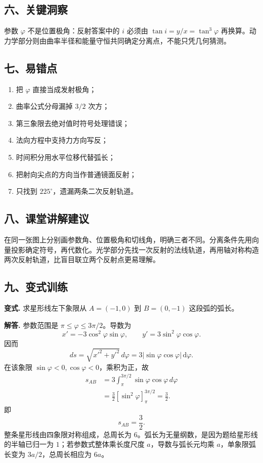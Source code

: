 \documentclass[12pt,a4paper,UTF8]{ctexart}
\newcommand{\tightlist}{\setlength{\itemsep}{0pt}\setlength{\parskip}{0pt}}
\begin{document}
\subsection{六、关键洞察}\label{ux516dux5173ux952eux6d1eux5bdf-6}

参数 \(\varphi\) 不是位置极角：反射答案中的 \(i\) 必须由
\(\tan i=y/x=\tan^3\varphi\)
再换算。动力学部分则由曲率半径和能量守恒共同确定分离点，不能只凭几何猜测。

\subsection{七、易错点}\label{ux4e03ux6613ux9519ux70b9-6}

\begin{enumerate}
\def\labelenumi{\arabic{enumi}.}
\tightlist
\item
  把 \(\varphi\) 直接当成发射极角；
\item
  曲率公式分母漏掉 \(3/2\) 次方；
\item
  第三象限去绝对值时符号处理错误；
\item
  法向方程中支持力方向写反；
\item
  时间积分用水平位移代替弧长；
\item
  把射向尖点的方向当作普通镜面反射；
\item
  只找到 \(225^\circ\)，遗漏两条二次反射轨道。
\end{enumerate}

\subsection{八、课堂讲解建议}\label{ux516bux8bfeux5802ux8bb2ux89e3ux5efaux8bae-6}

在同一张图上分别画参数角、位置极角和切线角，明确三者不同。分离条件先用向量投影确定符号，再代数化。光学部分先找一次反射的法线轨道，再用轴对称构造两次反射轨道，比盲目联立两个反射点更易理解。

\subsection{九、变式训练}\label{ux4e5dux53d8ux5f0fux8badux7ec3-6}

\textbf{变式.} 求星形线左下象限从 \(A=(-1,0)\) 到 \(B=(0,-1)\)
这段弧的弧长。

\textbf{解答.} 参数范围是 \(\pi\le\varphi\le3\pi/2\)。导数为 \[
x'=-3\cos^2\varphi\sin\varphi,
\qquad
y'=3\sin^2\varphi\cos\varphi.
\] 因而 \[
ds=\sqrt{x'^2+y'^2}\,d\varphi
=3|\sin\varphi\cos\varphi|\,\mathrm d\varphi.
\] 在该象限 \(\sin\varphi<0,\cos\varphi<0\)，乘积为正，故 \[
\begin{aligned}
s_{AB}
&=3\int_\pi^{3\pi/2}\sin\varphi\cos\varphi\,d\varphi\\
&=\frac32\left[\sin^2\varphi\right]_\pi^{3\pi/2}
=\frac32.
\end{aligned}
\] 即 \[
\boxed{s_{AB}=\frac32}.
\] 整条星形线由四象限对称组成，总周长为
\(6\)。弧长为无量纲数，是因为题给星形线的半轴已归一为
\(1\)；若参数式整体乘长度尺度 \(a\)，导数与弧长元均乘
\(a\)，单象限弧长变为 \(3a/2\)，总周长相应为 \(6a\)。
\end{document}
